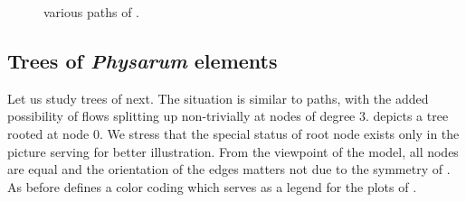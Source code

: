		\begin{figure}
			\centering
			\qquad
			\newline
			\qquad
			\newline
			\qquad
			\newline
			\qquad
			
			\caption[Path simulations]{various paths of \Pes.}
			\label{fig:paths}
		\end{figure}



	\subsection{Trees of \emph{Physarum} elements}
		
		Let us study trees of \Pes next. The situation is similar to paths, with the added possibility of flows splitting up non-trivially at nodes of degree $3$.  depicts a tree rooted at node $0$. We stress that the special status of root node exists only in the picture serving for better illustration. From the viewpoint of the model, all nodes are equal and the orientation of the edges matters not due to the symmetry of \Pes. As before  defines a color coding which serves as a legend for the plots of .

